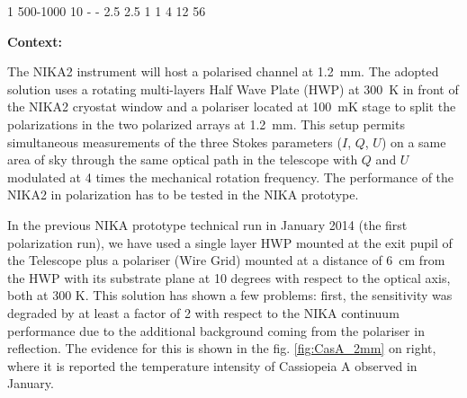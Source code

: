 \documentclass[12pt,a4]{article}
\begin{document}
%
\NIKAparams
 {1}    %
 {500-1000}  %
 {10}  %
 {-}  %
 {-}  %
 {2.5}  %
 {2.5}  %
%
\NIKAtimes
 {1}          %
 {1}          %
 {4}          %
 {12}         %
 {56}        %
 {} %
%
%
\techsheetPV
%
\maketitle

{\bfseries Context:}

The NIKA2 instrument will host a polarised channel at 1.2~mm. The adopted
solution uses a rotating multi-layers Half Wave Plate (HWP) at 300~K in front
of the NIKA2 cryostat window and a polariser located at 100~mK stage to split
the polarizations in the two polarized arrays at 1.2~mm. This setup permits
simultaneous measurements of the three Stokes parameters ($I$, $Q$, $U$) on a
same area of sky through the same optical path in the telescope with $Q$ and
$U$ modulated at 4 times the mechanical rotation frequency. The performance of
the NIKA2 in polarization has to be tested in the NIKA prototype.

In the previous NIKA prototype technical run in January 2014 (the first
polarization run), we have used a single layer HWP mounted at the exit pupil
of the Telescope plus a polariser (Wire Grid) mounted at a distance of 6~cm
from the HWP with its substrate plane at 10 degrees with respect to the
optical axis, both at 300 K. This solution has shown a few problems: first,
the sensitivity was degraded by at least a factor of 2 with respect to the
NIKA continuum performance due to the additional background coming from the
polariser in reflection. The evidence for this is shown in the fig. \ref{fig:CasA_2mm} on right, 
where it is reported the temperature intensity of Cassiopeia A observed in January.
\end{document}

